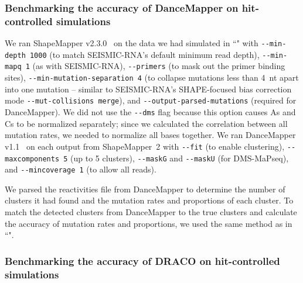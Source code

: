 \documentclass[unnumsec,webpdf,contemporary,large]{oup-authoring-template}%
\theoremstyle{thmstyleone}%
\theoremstyle{thmstyletwo}%
\theoremstyle{thmstylethree}%
\begin{document}
\subsubsection{Benchmarking the accuracy of DanceMapper on hit-controlled simulations}
\label{benchmark-accuracy-dance}

We ran ShapeMapper v2.3.0~\cite{Busan2018} on the data we had simulated in ``" with \verb|--min-depth 1000| (to match SEISMIC-RNA's default minimum read depth), \verb|--min-mapq 1| (as with SEISMIC-RNA), \verb|--primers| (to mask out the primer binding sites), \verb|--min-mutation-separation 4| (to collapse mutations less than 4~nt apart into one mutation -- similar to SEISMIC-RNA's SHAPE-focused bias correction mode \verb|--mut-collisions merge|), and \verb|--output-parsed-mutations| (required for DanceMapper).
We did not use the \verb|--dms| flag because this option causes As and Cs to be normalized separately; since we calculated the correlation between all mutation rates, we needed to normalize all bases together.
We ran DanceMapper v1.1~\cite{Olson2022} on each output from ShapeMapper~2 with \verb|--fit| (to enable clustering), \verb|--maxcomponents 5| (up to 5 clusters), \verb|--maskG| and \verb|--maskU| (for DMS-MaPseq), and \verb|--mincoverage 1| (to allow all reads).

We parsed the reactivities file from DanceMapper to determine the number of clusters it had found and the mutation rates and proportions of each cluster.
To match the detected clusters from DanceMapper to the true clusters and calculate the accuracy of mutation rates and proportions, we used the same method as in ``".

\subsubsection{Benchmarking the accuracy of DRACO on hit-controlled simulations}
\label{benchmark-accuracy-draco}
\end{document}
